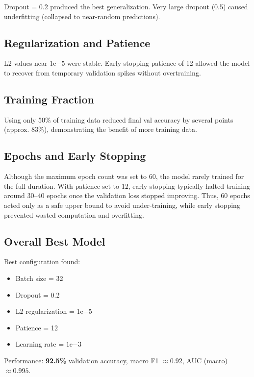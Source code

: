 \documentclass[conference]{IEEEtran}
\begin{document}
Dropout = 0.2 produced the best generalization. Very large dropout (0.5) caused underfitting (collapsed to near-random predictions).

\subsection{Regularization and Patience}
L2 values near \(1\mathrm{e}{-5}\) were stable. Early stopping patience of 12 allowed the model to recover from temporary validation spikes without overtraining.

\subsection{Training Fraction}
Using only 50\% of training data reduced final val accuracy by several points (approx. 83\%), demonstrating the benefit of more training data.

\subsection{Epochs and Early Stopping}
Although the maximum epoch count was set to 60, the model rarely trained for the full duration. 
With patience set to 12, early stopping typically halted training around 30--40 epochs once the validation loss stopped improving. 
Thus, 60 epochs acted only as a safe upper bound to avoid under-training, while early stopping prevented wasted computation and overfitting.

\subsection{Overall Best Model}
Best configuration found:
\begin{itemize}
  \item Batch size = 32
  \item Dropout = 0.2
  \item L2 regularization = \(1\mathrm{e}{-5}\)
  \item Patience = 12
  \item Learning rate = \(1\mathrm{e}{-3}\)
\end{itemize}
Performance: \textbf{92.5\%} validation accuracy, macro F1 \(\approx 0.92\), AUC (macro) \(\approx 0.995\).
\end{document}

